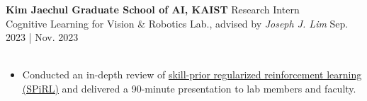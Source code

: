 \documentclass[a4paper,10pt]{extarticle}
\begin{document}

\noindent\textbf{Kim Jaechul Graduate School of AI, KAIST} \hfill Research Intern\\
Cognitive Learning for Vision \& Robotics Lab., advised by \textsl{Joseph J. Lim} \hfill Sep. 2023 | Nov. 2023\\
\vspace*{-0.25cm}\\
\begin{minipage}{0.77\textwidth}
	\footnotesize
	\begin{itemize}
		\item Conducted an in-depth review of \href{https://clvrai.github.io/spirl/}{\ul{skill-prior regularized reinforcement learning (SPiRL)}} and delivered a 90-minute presentation  to lab members and faculty.
	\end{itemize}
\end{minipage}\\
\end{document}
